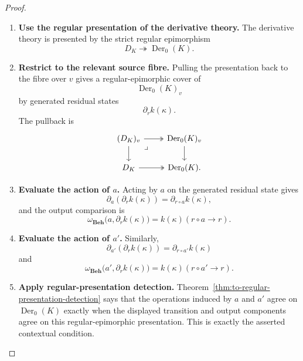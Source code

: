 \begin{proof}
    \leavevmode
    \begin{enumerate}
        \item \textbf{Use the regular presentation of the derivative theory.}
        The derivative theory is presented by the strict regular epimorphism
        \[
            D_K\twoheadrightarrow\operatorname{Der}_0(K).
        \]

        \item \textbf{Restrict to the relevant source fibre.}
        Pulling the presentation back to the fibre over \(v\) gives a
        regular-epimorphic cover of
        \[
            \operatorname{Der}_0(K)_v
        \]
        by generated residual states
        \[
            \partial_rk(\kappa).
        \]
        The pullback is
        \[
        \begin{tikzcd}
            (D_K)_v
                \arrow[r, two heads]
                \arrow[d]
                \arrow[dr, phantom, "\lrcorner", very near start]
            &
            \operatorname{Der}_0(K)_v
                \arrow[d]
            \\
            D_K
                \arrow[r, two heads]
            &
            \operatorname{Der}_0(K).
        \end{tikzcd}
        \]

        \item \textbf{Evaluate the action of \(a\).}
        Acting by \(a\) on the generated residual state gives
        \[
            \partial_a(\partial_rk(\kappa))
            =
            \partial_{r\circ a}k(\kappa),
        \]
        and the output comparison is
        \[
            \omega_{\mathbf{Beh}}
            \bigl(a,\partial_rk(\kappa)\bigr)
            =
            k(\kappa)(r\circ a\to r).
        \]

        \item \textbf{Evaluate the action of \(a'\).}
        Similarly,
        \[
            \partial_{a'}(\partial_rk(\kappa))
            =
            \partial_{r\circ a'}k(\kappa)
        \]
        and
        \[
            \omega_{\mathbf{Beh}}
            \bigl(a',\partial_rk(\kappa)\bigr)
            =
            k(\kappa)(r\circ a'\to r).
        \]

        \item \textbf{Apply regular-presentation detection.}
        Theorem~\ref{thm:to-regular-presentation-detection} says that the
        operations induced by \(a\) and \(a'\) agree on
        \(\operatorname{Der}_0(K)\) exactly when the displayed transition and
        output components agree on this regular-epimorphic presentation.
        This is exactly the asserted contextual condition.
    \end{enumerate}
\end{proof}

